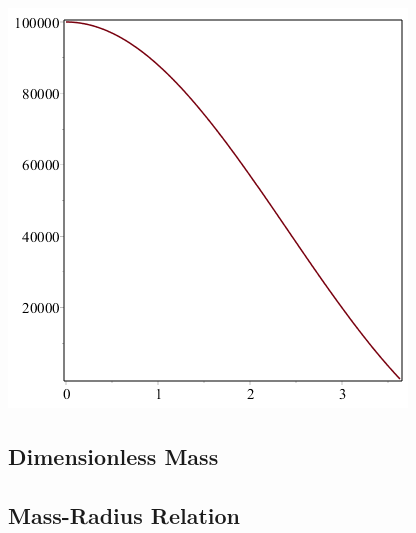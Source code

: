 \documentclass[11pt]{article} %
\begin{document}
\includegraphics[scale=.5]{plots/wd8.png}\\


\subsection*{Dimensionless Mass}

\subsection*{Mass-Radius Relation}
\end{document}
